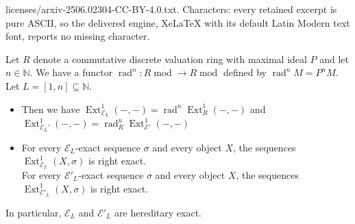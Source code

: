 \documentclass[10pt,a4paper]{amsart}
\DeclareMathOperator{\Ext}{Ext}
\DeclareMathOperator{\modu}{mod}
\DeclareMathOperator{\rad}{rad}
\newcommand{\mcE}{\mathcal{E}}
\begin{document}
licenses/arxiv-2506.02304-CC-BY-4.0.txt. Characters: every retained excerpt is pure ASCII, so the delivered engine, XeLaTeX with its default Latin Modern text font, reports no missing character.
\begin{lem} \label{radExt} Let $R$ denote a commutative discrete valuation ring   with maximal ideal $P$ and let $n \in\mathbb{N}$.  
We have a functor $\rad^n \colon R\modu \to R\modu$ defined by $\rad^n M = P^n M$. Let $L=[1,n]\subseteq \mathbb{N}$. 
\begin{itemize}
\item[(1)] Then we have $\Ext^1_{\mcE_L} (-,-)=\rad^n\Ext^1_R(-,-)$ and $\Ext^1_{\mcE_L'} (-,-)=\rad^n_R\Ext^1_{\mcE'}(-,-)$
\item[(2)] For every $\mcE_L$-exact sequence $\sigma$ and every object $X$, the sequences $\Ext^1_{\mcE_L} (X,\sigma)$ is right exact.\\
\noindent
For every $\mcE'_L$-exact sequence $\sigma$ and every object $X$, the sequences $\Ext^1_{\mcE'_L} (X,\sigma)$ is right exact.
\end{itemize}    
In particular, $\mcE_L$ and $\mcE'_L$ are hereditary exact. 
\end{lem}
\end{document}
